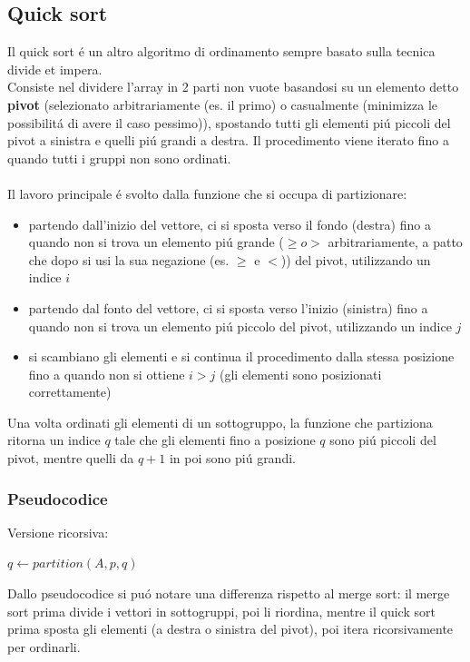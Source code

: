 \documentclass{article}
\begin{document}
\subsection{Quick sort}
Il quick sort é un altro algoritmo di ordinamento sempre basato sulla tecnica divide et impera.\\
Consiste nel dividere l'array in 2 parti non vuote basandosi su un elemento detto \textbf{pivot} (selezionato arbitrariamente (es. il primo) o casualmente (minimizza le possibilitá di avere il caso pessimo)), spostando tutti gli elementi piú piccoli del pivot a sinistra e quelli piú grandi a destra. Il procedimento viene iterato fino a quando tutti i gruppi non sono ordinati.\\\\
Il lavoro principale é svolto dalla funzione che si occupa di partizionare:
\begin{itemize}
	\item partendo dall'inizio del vettore, ci si sposta verso il fondo (destra) fino a quando non si trova un elemento piú grande ($\ge o >$ arbitrariamente, a patto che dopo si usi la sua negazione (es. $\ge$ e $<$)) del pivot, utilizzando un indice $i$
	\item partendo dal fonto del vettore, ci si sposta verso l'inizio (sinistra) fino a quando non si trova un elemento piú piccolo del pivot, utilizzando un indice $j$
	\item si scambiano gli elementi e si continua il procedimento dalla stessa posizione fino a quando non si ottiene $i > j$ (gli elementi sono posizionati correttamente)
\end{itemize}
Una volta ordinati gli elementi di un sottogruppo, la funzione che partiziona ritorna un indice $q$ tale che gli elementi fino a posizione $q$ sono piú piccoli del pivot, mentre quelli da $q+1$ in poi sono piú grandi.

\subsubsection{Pseudocodice}
Versione ricorsiva:
\begin{algorithmic}
	\State $q \gets partition(A,p,q)$ 
	\State {} 
	\State {} 
\EndIf
\EndFunction
\end{algorithmic}
Dallo pseudocodice si puó notare una differenza rispetto al merge sort: il merge sort prima divide i vettori in sottogruppi, poi li riordina, mentre il quick sort prima sposta gli elementi (a destra o sinistra del pivot), poi itera ricorsivamente per ordinarli.
\end{document}
